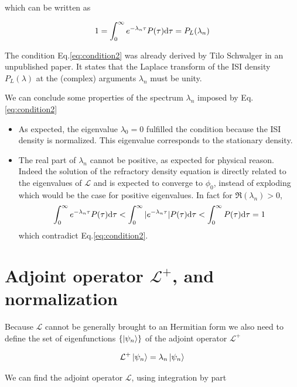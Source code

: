 \documentclass[12pt,twoside]{report}
\def \dd  {{\rm d}}
\begin{document}
which can be written as

\begin{equation}
\label{eq:condition2}
1=\int_0^\infty e^{-\lambda_n \tau}P(\tau)\dd\tau=P_L(\lambda_n)\\
\end{equation}

The condition Eq.\eqref{eq:condition2} was already derived by Tilo Schwalger in an unpublished paper. It states that the Laplace transform of the ISI density $P_L(\lambda)$ at the (complex) arguments $\lambda_{n}$ must be unity. 

We can conclude some properties of the spectrum {$\lambda_n$} imposed by Eq.\eqref{eq:condition2}

\begin{itemize}
\item As expected, the eigenvalue $\lambda_0=0$ fulfilled the condition because the ISI density is normalized. This eigenvalue corresponds to the stationary density.
\item The real part of $\lambda_n$ cannot be positive, as expected for physical reason. Indeed the solution of the refractory density equation is directly related to the eigenvalues of $\mathcal{L}$ and is expected to converge to $\phi_0$, instead of exploding which would be the case for positive eigenvalues. In fact for $\Re(\lambda_n)>0$,\begin{equation}
\int_0^\infty e^{-\lambda_n \tau} P(\tau) \dd\tau<\int_0^\infty |e^{-\lambda_n\tau} |P(\tau) \dd\tau<\int_0^\infty P(\tau) \dd\tau=1
\end{equation}which contradict Eq.\eqref{eq:condition2}.
\end{itemize}


\section{Adjoint operator $\mathcal{L}^+$, and normalization}
\label{sec:adop}

Because $\mathcal{L}$ cannot be generally brought to an Hermitian form we also need to define the set of eigenfunctions $\{\ket{\psi_n}\}$ of the adjoint operator $\mathcal{L}^{+}$

\begin{equation}
\label{eq:Ldegaoperator}
\mathcal{L}^+\ket{\psi_n}=\lambda_n\ket{\psi_n}
\end{equation}

We can find the adjoint operator $\mathcal{L}$, using integration by part
\end{document}

